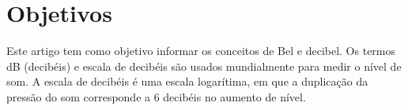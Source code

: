 \section{Objetivos}
Este artigo tem como objetivo informar os conceitos de Bel e decibel. Os termos dB (decibéis) e escala de decibéis são usados mundialmente para medir o nível de som. A escala de decibéis é uma escala logarítima, em que a duplica\c{c}ão da pressão do som corresponde a 6 decibéis no aumento de nível.